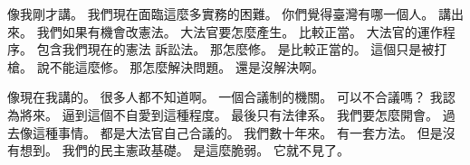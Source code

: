 \hypertarget{w01:cue:1701}{}像我剛才講。
\hypertarget{w01:cue:1702}{}我們現在面臨這麼多實務的困難。
\hypertarget{w01:cue:1703}{}你們覺得臺灣有哪一個人。
\hypertarget{w01:cue:1704}{}講出來。
\hypertarget{w01:cue:1705}{}我們如果有機會改憲法。
\hypertarget{w01:cue:1706}{}大法官要怎麼產生。
\hypertarget{w01:cue:1707}{}比較正當。
\hypertarget{w01:cue:1708}{}大法官的運作程序。
\hypertarget{w01:cue:1709}{}包含我們現在的憲法
\hypertarget{w01:cue:1710}{}訴訟法。
\hypertarget{w01:cue:1711}{}那怎麼修。
\hypertarget{w01:cue:1712}{}是比較正當的。
\hypertarget{w01:cue:1713}{}這個只是被打槍。
\hypertarget{w01:cue:1714}{}說不能這麼修。
\hypertarget{w01:cue:1715}{}那怎麼解決問題。
\hypertarget{w01:cue:1716}{}還是沒解決啊。

\hypertarget{w01:cue:1717}{}像現在我講的。
\hypertarget{w01:cue:1718}{}很多人都不知道啊。
\hypertarget{w01:cue:1719}{}一個合議制的機關。
\hypertarget{w01:cue:1720}{}可以不合議嗎？
\hypertarget{w01:cue:1721}{}我認為將來。
\hypertarget{w01:cue:1722}{}逼到這個不自愛到這種程度。
\hypertarget{w01:cue:1723}{}最後只有法律系。
\hypertarget{w01:cue:1724}{}我們要怎麼開會。
\hypertarget{w01:cue:1725}{}過去像這種事情。
\hypertarget{w01:cue:1726}{}都是大法官自己合議的。
\hypertarget{w01:cue:1727}{}我們數十年來。
\hypertarget{w01:cue:1728}{}有一套方法。
\hypertarget{w01:cue:1729}{}但是沒有想到。
\hypertarget{w01:cue:1730}{}我們的民主憲政基礎。
\hypertarget{w01:cue:1731}{}是這麼脆弱。
\hypertarget{w01:cue:1732}{}它就不見了。

